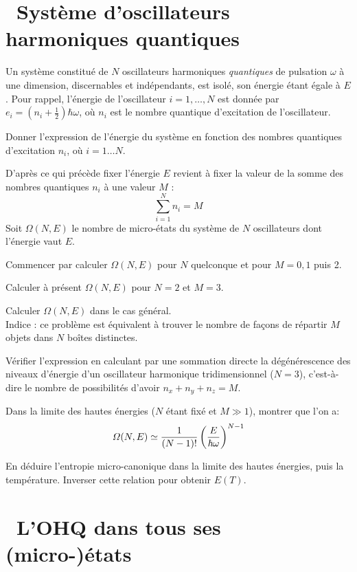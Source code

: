 \documentclass[utf8, 11pt]{feuille}
\begin{document}




\section{\medium~Système d'oscillateurs harmoniques quantiques}

Un système constitué de $N$ oscillateurs harmoniques {\it quantiques} de pulsation $\omega$ à une dimension, discernables et indépendants, est isolé, son énergie étant égale à $E$. Pour rappel, l'énergie de l'oscillateur $i=1,\dots,N$ est donnée par $e_i=(n_i+\frac{1}{2})\hbar \omega$, où $n_i$ est le nombre quantique d'excitation de l'oscillateur.

\question
Donner l'expression de l'énergie du système en fonction des nombres quantiques d'excitation $n_i$, où $i=1\dots N$.

\medskip
D'après ce qui précède fixer l'énergie $E$ revient à fixer la valeur de la somme des nombres quantiques $n_i$ à une valeur
$M$ :
$$
\sum_{i=1}^N n_i=M
$$
Soit $\varOmega(N,E)$ le nombre de micro-états du système de $N$ oscillateurs dont l'énergie vaut $E$.
 
\question
Commencer par calculer $\varOmega(N,E)$ pour $N$ quelconque et pour $M=0,1$ puis 2.

\question
Calculer à présent $\varOmega(N,E)$ pour $N=2$ et $M=3$.
	
\question
Calculer $\varOmega(N,E)$ dans le cas général.\\
Indice : ce problème est équivalent à trouver le nombre de façons de répartir $M$ objets dans $N$ boîtes distinctes.

\question
Vérifier l'expression en calculant par une sommation directe la dégénérescence des niveaux d'énergie d'un oscillateur harmonique tridimensionnel ($N=3$), c'est-à-dire le nombre de possibilités d'avoir $n_x+n_y+n_z=M$.

\question
Dans la limite des hautes énergies ($N$ étant fixé et $M \gg 1$), montrer que l'on a:
$$
\varOmega(N,E)\simeq {1\over (N-1)!}\left({E\over \hbar  \omega}\right)^{N-1}
$$

\question
En déduire l'entropie micro-canonique dans la limite des hautes énergies, puis la température. Inverser cette relation pour obtenir $E(T)$.


\section{\medium~L'OHQ dans tous ses (micro-)états}
\end{document}
